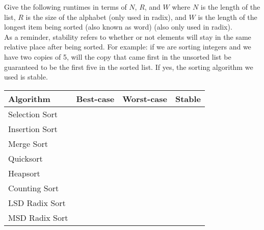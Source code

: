 Give the following runtimes in terms of $N$, $R$, and $W$ where $N$ is the length of the list, $R$ is the size of the alphabet (only used in radix),
and $W$ is the length of the longest item being sorted (also known as word) (also only used in radix).\\

As a reminder, stability refers to whether or not elements will stay in the same relative place after being sorted. For example: if we are sorting integers and we have two copies of 5, will the copy that came first in the unsorted list be guaranteed to be the first five in the sorted list. If yes, the sorting algorithm we used is stable. 
\ifprintanswers\else
{
\renewcommand{\arraystretch}{2}
\setlength{\tabcolsep}{12pt}
\begin{tabularx}{\textwidth}{Xlll}
Algorithm         & Best-case & Worst-case & Stable \\\hline
Selection Sort    &           &            &        \\
Insertion Sort    &           &            &        \\
Merge Sort        &           &            &        \\
Quicksort         &           &            &        \\
Heapsort          &           &            &        \\
Counting Sort     &           &            &        \\
LSD Radix Sort    &           &            &        \\
MSD Radix Sort    &           &            &
\end{tabularx}
}
\fi

